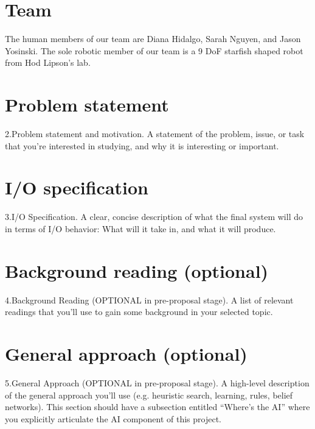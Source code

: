 \section{Team}

The human members of our team are Diana Hidalgo, Sarah Nguyen, and
Jason Yosinski.  The sole robotic member of our team is a 9 DoF
starfish shaped robot from Hod Lipson's lab.



\section{Problem statement}


2.Problem statement and motivation. A statement of the problem, issue,
or task that you’re interested in studying, and why it is interesting
or important.



\section{I/O specification}


3.I/O Specification. A clear, concise description of what the final
system will do in terms of I/O behavior: What will it take in, and
what it will produce.



\section{Background reading (optional)}


4.Background Reading (OPTIONAL in pre-proposal stage). A list of
relevant readings that you’ll use to gain some background in your
selected topic.



\section{General approach (optional)}


5.General Approach (OPTIONAL in pre-proposal stage). A high-level
description of the general approach you’ll use (e.g. heuristic search,
learning, rules, belief networks). This section should have a
subsection entitled “Where’s the AI” where you explicitly articulate
the AI component of this project.




